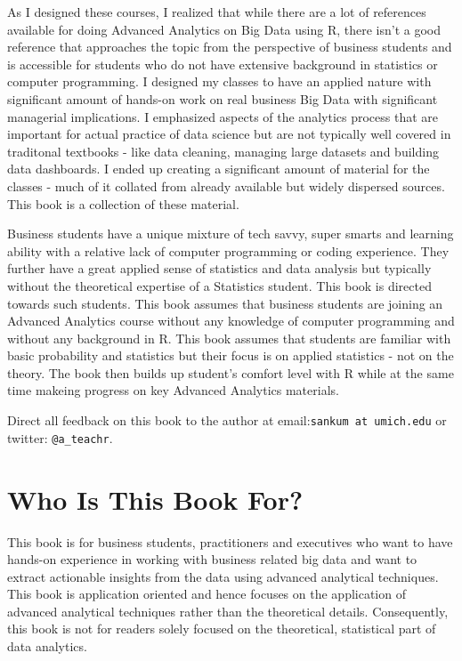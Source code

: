 \documentclass[]{krantz}
\theoremstyle{definition}
\theoremstyle{definition}
\theoremstyle{definition}
\theoremstyle{remark}
\begin{document}
As I designed these courses, I realized that while there are a lot of
references available for doing Advanced Analytics on Big Data using R,
there isn't a good reference that approaches the topic from the
perspective of business students and is accessible for students who do
not have extensive background in statistics or computer programming. I
designed my classes to have an applied nature with significant amount of
hands-on work on real business Big Data with significant managerial
implications. I emphasized aspects of the analytics process that are
important for actual practice of data science but are not typically well
covered in traditonal textbooks - like data cleaning, managing large
datasets and building data dashboards. I ended up creating a significant
amount of material for the classes - much of it collated from already
available but widely dispersed sources. This book is a collection of
these material.

Business students have a unique mixture of tech savvy, super smarts and
learning ability with a relative lack of computer programming or coding
experience. They further have a great applied sense of statistics and
data analysis but typically without the theoretical expertise of a
Statistics student. This book is directed towards such students. This
book assumes that business students are joining an Advanced Analytics
course without any knowledge of computer programming and without any
background in R. This book assumes that students are familiar with basic
probability and statistics but their focus is on applied statistics -
not on the theory. The book then builds up student's comfort level with
R while at the same time makeing progress on key Advanced Analytics
materials.

Direct all feedback on this book to the author at
email:\texttt{sankum\ at\ umich.edu} or twitter: \texttt{@a\_teachr}.

\section*{Who Is This Book For?}\label{who-is-this-book-for}


This book is for business students, practitioners and executives who
want to have hands-on experience in working with business related big
data and want to extract actionable insights from the data using
advanced analytical techniques. This book is application oriented and
hence focuses on the application of advanced analytical techniques
rather than the theoretical details. Consequently, this book is not for
readers solely focused on the theoretical, statistical part of data
analytics.
\end{document}
